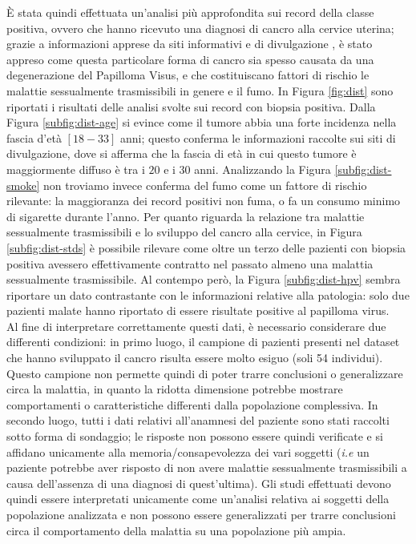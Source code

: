 È stata quindi effettuata un'analisi più approfondita sui record della classe positiva, ovvero che hanno ricevuto una diagnosi di cancro alla cervice uterina;  grazie a informazioni apprese da siti informativi e di divulgazione \cite{veronesi}, è stato appreso come questa particolare forma di cancro sia spesso causata da una degenerazione del Papilloma Visus, e che costituiscano fattori di rischio le malattie sessualmente trasmissibili in genere e il fumo.
In Figura \ref{fig:dist} sono riportati i risultati delle analisi svolte sui record con biopsia positiva.
Dalla Figura \ref{subfig:dist-age} si evince come il tumore abbia una forte incidenza nella fascia d'età $[18-33]$ anni; questo conferma le informazioni raccolte sui siti di divulgazione, dove si afferma che la fascia di età in cui questo tumore è maggiormente diffuso è tra i $20$ e i $30$ anni.
Analizzando la Figura \ref{subfig:dist-smoke} non troviamo invece conferma del fumo come un fattore di rischio rilevante: la maggioranza dei record positivi non fuma, o fa un consumo minimo di sigarette durante l'anno.
Per quanto riguarda la relazione tra malattie sessualmente trasmissibili e lo sviluppo del cancro alla cervice, in Figura \ref{subfig:dist-stds} è possibile rilevare come oltre un terzo delle pazienti con biopsia positiva avessero effettivamente contratto nel passato almeno una malattia sessualmente trasmissibile.
Al contempo però, la Figura \ref{subfig:dist-hpv} sembra riportare un dato contrastante con le informazioni relative alla patologia: solo due pazienti malate hanno riportato di essere risultate positive al papilloma virus.\\
Al fine di interpretare correttamente questi dati, è necessario considerare due differenti condizioni: in primo luogo, il campione di pazienti presenti nel dataset che hanno sviluppato il cancro risulta essere molto esiguo (soli 54 individui).
Questo campione non permette quindi di poter trarre conclusioni o generalizzare circa la malattia, in quanto la ridotta dimensione potrebbe mostrare comportamenti o caratteristiche differenti dalla popolazione complessiva.
In secondo luogo, tutti i dati relativi all'anamnesi del paziente sono stati raccolti sotto forma di sondaggio; le risposte non possono essere quindi verificate e si affidano unicamente alla memoria/consapevolezza dei vari soggetti (\textit{i.e} un paziente potrebbe aver risposto di non avere malattie sessualmente trasmissibili a causa dell'assenza di una diagnosi di quest'ultima).
Gli studi effettuati devono quindi essere interpretati unicamente come un'analisi relativa ai soggetti della popolazione analizzata e non possono essere generalizzati per trarre conclusioni circa il comportamento della malattia su una popolazione più ampia.

